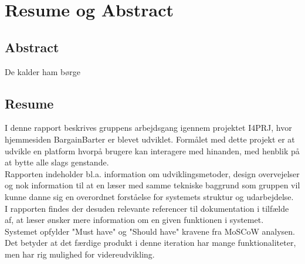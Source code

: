 \chapter{Resume og Abstract}

\section{Abstract}
De kalder ham børge


\section{Resume}

I denne rapport beskrives gruppens arbejdsgang igennem projektet I4PRJ, hvor hjemmesiden BargainBarter er blevet udviklet. Formålet med dette projekt er at udvikle en platform hvorpå brugere kan interagere med hinanden, med henblik på at bytte alle slags genstande.
\\Rapporten indeholder bl.a. information om udviklingsmetoder, design overvejelser og nok information til at en læser med samme tekniske baggrund som gruppen vil kunne danne sig en overordnet forståelse for systemets struktur og udarbejdelse. 
\\I rapporten findes der desuden relevante referencer til dokumentation i tilfælde af, at læser ønsker mere information om en given funktionen i systemet. 
\\Systemet opfylder "Must have" og "Should have" kravene fra MoSCoW analysen. Det betyder at det færdige produkt i denne iteration har mange funktionaliteter, men har rig mulighed for videreudvikling. 
